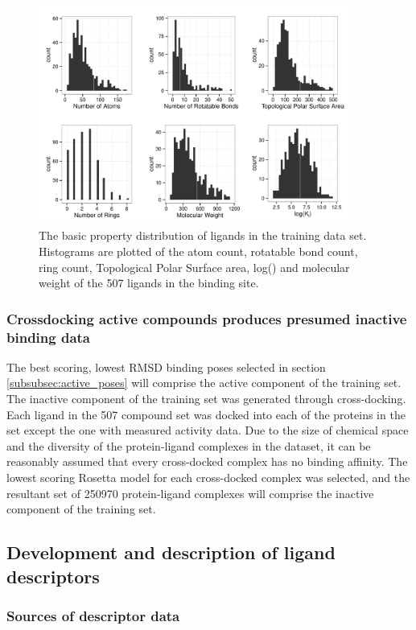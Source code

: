 \begin{figure}
\centering
\includegraphics[width=4in]{figures/hts/basic_ligand_properties.pdf}
\caption{
The basic property distribution of ligands in the training data set.  Histograms are plotted of the atom count, rotatable bond count, ring count, Topological Polar Surface area, log(\ki) and molecular weight of the 507 ligands in the binding site. 
}
\label{fig:training_ligands}
\end{figure}

\subsubsection{Crossdocking active compounds produces presumed inactive binding data}
The best scoring, lowest RMSD binding poses selected in section \ref{subsubsec:active_poses} will comprise the active component of the training set.
The inactive component of the training set was generated through cross-docking.
Each ligand in the 507 compound set was docked into each of the proteins in the set except the one with measured activity data.
Due to the size of chemical space\citep{Reymond:2012un} and the diversity of the protein-ligand complexes in the dataset, it can be reasonably assumed that every cross-docked complex has no binding affinity.
The lowest scoring Rosetta model for each cross-docked complex was selected, and the resultant set of 250970 protein-ligand complexes will comprise the inactive component of the training set.

\subsection{Development and description of ligand descriptors}

\subsubsection{Sources of descriptor data} 


